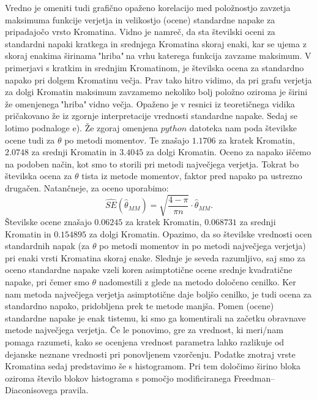 \documentclass{article}
\begin{document}
Vredno je omeniti tudi grafično opaženo korelacijo med položnostjo zavzetja maksimuma funkcije verjetja in velikostjo (ocene) standardne napake za pripadajočo vrsto Kromatina.
Vidno je namreč, da sta številski oceni za standardni napaki kratkega in srednjega Kromatina skoraj enaki, kar se ujema z skoraj enakima širinama$~$"hriba"$~$na vrhu katerega funkcija zavzame maksimum. 
V primerjavi s kratkim in srednjim Kromatinom, je številska ocena za standardno napako pri dolgem Kromatinu večja. 
Prav tako hitro vidimo, da pri grafu verjetja za dolgi Kromatin maksimum zavzamemo nekoliko bolj položno oziroma je širini že omenjenega$~$"hriba"$~$vidno večja.
Opaženo je v resnici iz teoretičnega vidika pričakovano že iz zgornje interpretacije vrednosti standardne napake. 
\newline
\newline
Sedaj se lotimo podnaloge e). Že zgoraj omenjena $python$ datoteka nam poda številske ocene tudi za $\theta$ po metodi momentov. 
Te znašajo $1.1706$ za kratek Kromatin, $2.0748$ za srednji Kromatin in $3.4045$ za dolgi Kromatin.
Oceno za napako iščemo na podoben način, kot smo to storili pri metodi največjega verjetja. Tokrat bo številska ocena za $\theta$ tista iz metode momentov, faktor pred napako pa ustrezno drugačen. Natančneje, za oceno uporabimo:
$$
    \hat{SE}(\hat{\theta}_{MM}) = \sqrt{\frac{4 - \pi}{\pi n}} \cdot\hat{\theta}_{MM}.
$$
Številske ocene znašajo $0.06245$ za kratek Kromatin, $0.068731$ za srednji Kromatin in $0.154895$ za dolgi Kromatin.
\newline
Opazimo, da so številske vrednosti ocen standardnih napak (za $\theta$ po metodi momentov in po metodi največjega verjetja) pri enaki vrsti Kromatina skoraj enake. 
Slednje je seveda razumljivo, saj smo za oceno standardne napake vzeli koren asimptotične ocene srednje kvadratične napake, pri čemer smo $\theta$ nadomestili z glede na metodo določeno cenilko. 
Ker nam metoda največjega verjetja asimptotične daje boljšo cenilko, je tudi ocena za standardno napako, pridobljena prek te metode manjša. 
Pomen (ocene) standardne napake je enak tistemu, ki smo ga komentirali na začetku obravnave metode največjega verjetja.
Če le ponovimo, gre za vrednost, ki meri/nam pomaga razumeti, kako se ocenjena vrednost parametra lahko razlikuje od dejanske neznane vrednosti pri ponovljenem vzorčenju.
\newline
\newline
Podatke znotraj vrste Kromatina sedaj predstavimo še s histogramom. Pri tem določimo širino bloka oziroma število blokov histograma s pomočjo modificiranega Freedman–Diaconisovega pravila. 
\end{document}
